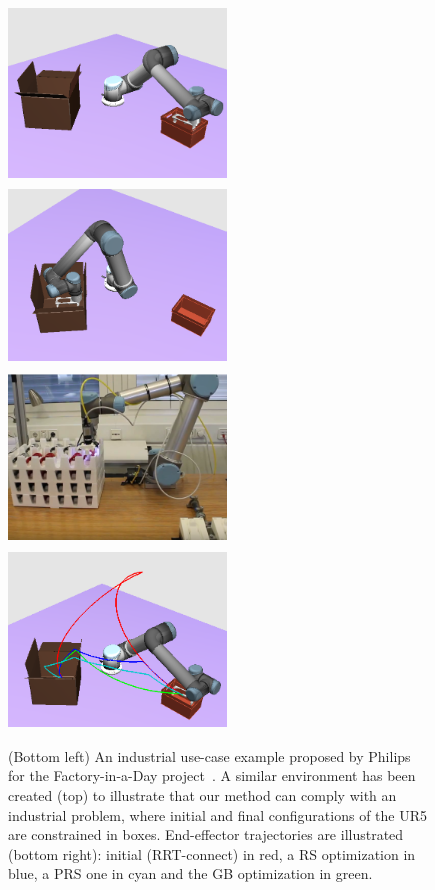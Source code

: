 \documentclass{tADR2e}
\begin{document}
\begin{figure}
	\centering
	\includegraphics[width=5.8cm,height=4.7cm]{fiad_qinit.png}
	\includegraphics[width=5.8cm,height=4.7cm]{fiad_qfinal.png}\\
	\includegraphics[width=5.8cm,height=4.7cm]{fiad_real.png}
	\includegraphics[width=5.8cm,height=4.7cm]{fiad_traj_prune.png}
	\caption{(Bottom left) An industrial use-case example proposed by Philips for 	
	the Factory-in-a-Day project~\cite{factory-day-video}. A similar environment 	
	has been created (top) to illustrate that our method can comply with an 
	industrial problem, where initial and final configurations of the UR5 are 
	constrained in boxes. End-effector trajectories 
	are illustrated (bottom right): initial (RRT-connect) in red, a RS 
	optimization in blue, a PRS one in cyan and the GB optimization in green.}
	\label{fiad}
\end{figure}
\end{document}
